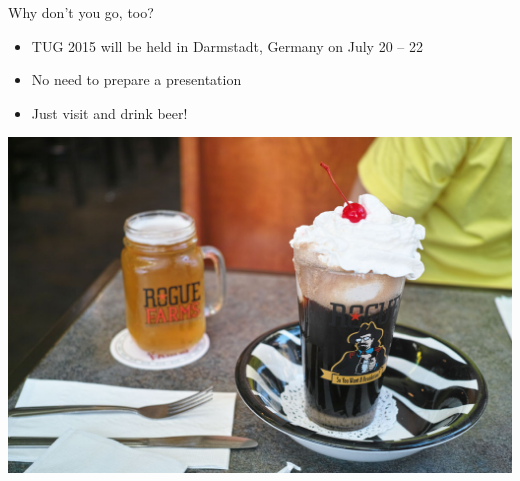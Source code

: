 \documentclass[17pt,dvipdfmx]{beamer}
\begin{document}
\begin{frame}[t]{Why don't you go, too?}
  \bfseries\rmfamily
  \begin{itemize}
    \item TUG 2015 will be held in Darmstadt, Germany on July 20 -- 22
    \item No need to prepare a presentation
    \pause \item Just visit and drink beer!
  \end{itemize}
  \begin{center}
    \includegraphics[width=.55\textwidth]{creambeer.jpg}
  \end{center}
\end{frame}
\end{document}

